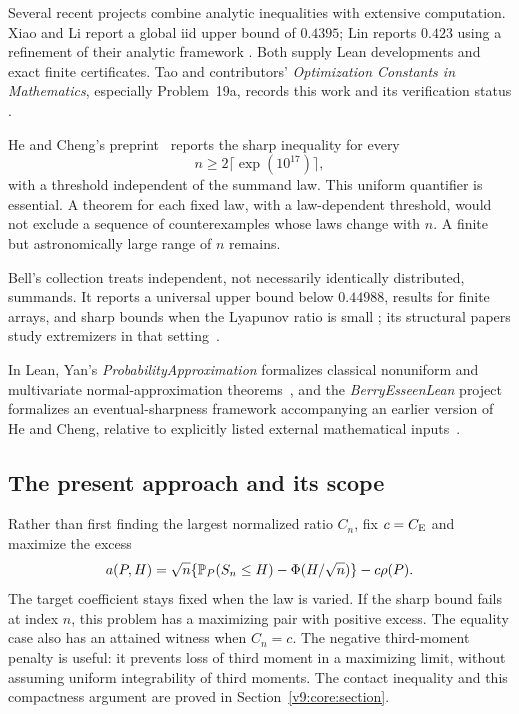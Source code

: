 Several recent projects combine analytic inequalities with extensive
computation. Xiao and Li report a global iid upper bound of $0.4395$;
Lin reports $0.423$ using a refinement of their analytic framework
\cite{xiao2026berryesseen,lin2026berryesseen}. Both supply Lean
developments and exact finite certificates. Tao and contributors' \emph{Optimization Constants in Mathematics},
especially Problem~19a, records this work and its verification status
\cite{tao2026berryesseenregistry}.

He and Cheng's preprint~\cite{hecheng2026eventually} reports the sharp
inequality for every
\[
 n\ge 2\lceil\exp(10^{17})\rceil,
\]
with a threshold independent of the summand law. This uniform quantifier
is essential. A theorem for each fixed law, with a law-dependent
threshold, would not exclude a sequence of counterexamples whose laws
change with $n$. A finite but astronomically large range of $n$ remains.

Bell's collection treats independent, not necessarily identically
distributed, summands. It reports a universal upper bound below
$0.44988$, results for finite arrays, and sharp bounds when the Lyapunov
ratio is small \cite{BellIndependent2026,BellFinite2026,BellSmall2026};
its structural papers study extremizers in that
setting~\cite{BellExtremizers2026,BellStructural2026}.

In Lean, Yan's \emph{ProbabilityApproximation} formalizes classical
nonuniform and multivariate normal-approximation
theorems~\cite{Yan2026ProbabilityApproximation}, and the
\emph{BerryEsseenLean} project formalizes an eventual-sharpness framework accompanying an earlier version of He
and Cheng, relative to explicitly listed external mathematical inputs~\cite{BerryEsseenLean2026}.

\subsection{The present approach and its scope}\label{ms:scope}

Rather than first finding the largest normalized ratio $C_n$, fix
$c=C_{\mathrm E}$ and maximize the excess
\begin{equation}\label{v9:intro:excess}
 a(P,H)=\sqrt n\{\mathbb P_P(S_n\le H)-\Phi(H/\sqrt n)\}-c\rho(P).
\end{equation}
The target coefficient stays fixed when the law is varied. If the sharp
bound fails at index $n$, this problem has a maximizing pair with positive
excess. The equality case also has an attained witness when $C_n=c$.
The negative third-moment penalty is useful: it prevents loss of third
moment in a maximizing limit, without assuming uniform integrability of
third moments. The contact inequality and this compactness argument are
proved in Section~\ref{v9:core:section}.

